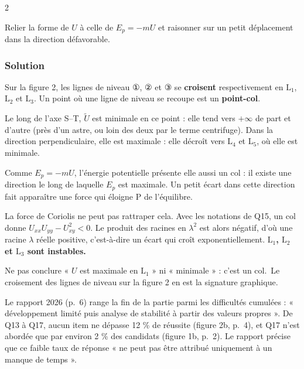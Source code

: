 \documentclass[11pt,a4paper]{article}
\begin{document}
\begin{indication}{2}

Relier la forme de \(U\) à celle de \(E_p=-mU\) et raisonner sur un petit déplacement dans la direction défavorable.

\end{indication}

\hypertarget{solution-12}{%
\subsubsection{Solution}\label{solution-12}}

Sur la figure 2, les lignes de niveau ①, ② et ③ se \textbf{croisent} respectivement en \(\mathrm L_1\), \(\mathrm L_2\) et \(\mathrm L_3\). Un point où une ligne de niveau se recoupe est un \textbf{point-col}.

Le long de l'axe S--T, \(\tilde U\) est minimale en ce point : elle tend vers \(+\infty\) de part et d'autre (près d'un astre, ou loin des deux par le terme centrifuge). Dans la direction perpendiculaire, elle est maximale : elle décroît vers \(\mathrm L_4\) et \(\mathrm L_5\), où elle est minimale.

Comme \(E_p=-mU\), l'énergie potentielle présente elle aussi un col : il existe une direction le long de laquelle \(E_p\) est maximale. Un petit écart dans cette direction fait apparaître une force qui éloigne P de l'équilibre.

La force de Coriolis ne peut pas rattraper cela. Avec les notations de Q15, un col donne \(U_{xx}U_{yy}-U_{xy}^2<0\). Le produit des racines en \(\lambda^2\) est alors négatif, d'où une racine \(\lambda\) réelle positive, c'est-à-dire un écart qui croît exponentiellement. \textbf{\(\mathrm L_1\), \(\mathrm L_2\) et \(\mathrm L_3\) sont instables.}

\begin{piege}

Ne pas conclure « \(U\) est maximale en \(\mathrm L_1\) » ni « minimale » : c'est un col.~Le croisement des lignes de niveau sur la figure 2 en est la signature graphique.

\end{piege}

\begin{jury}

Le rapport 2026 (p.~6) range la fin de la partie parmi les difficultés cumulées : « développement limité puis analyse de stabilité à partir des valeurs propres ». De Q13 à Q17, aucun item ne dépasse 12 \% de réussite (figure 2b, p.~4), et Q17 n'est abordée que par environ 2 \% des candidats (figure 1b, p.~2). Le rapport précise que ce faible taux de réponse « ne peut pas être attribué uniquement à un manque de temps ».

\end{jury}
\end{document}
